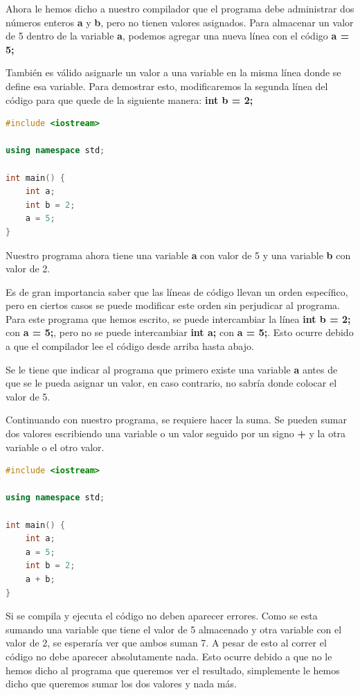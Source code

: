 \documentclass{article}
\begin{document}
Ahora le hemos dicho a nuestro compilador que el programa debe administrar dos números enteros \textbf{a} y \textbf{b}, pero no tienen valores asignados. Para almacenar un valor de 5 dentro de la variable \textbf{a}, podemos agregar una nueva línea con el código \textbf{a = 5;}

También es válido asignarle un valor a una variable en la misma línea donde se define esa variable. Para demostrar esto, modificaremos la segunda línea del código para que quede de la siguiente manera: \textbf{int b = 2;}

\begin{lstlisting}[language=C++, caption=Guardando valores]
#include <iostream>

using namespace std;

int main() {
    int a;
	int b = 2;
	a = 5;
}
\end{lstlisting}

Nuestro programa ahora tiene una variable \textbf{a} con valor de 5 y una variable \textbf{b} con valor de 2.

Es de gran importancia saber que las líneas de código llevan un orden específico, pero en ciertos casos se puede modificar este orden sin perjudicar al programa. Para este programa que hemos escrito, se puede intercambiar la línea \textbf{int b = 2;} con \textbf{a = 5;}, pero no se puede intercambiar \textbf{int a;} con \textbf{a = 5;}. Esto ocurre debido a que el compilador lee el código desde arriba hasta abajo.

Se le tiene que indicar al programa que primero existe una variable \textbf{a} antes de que se le pueda asignar un valor, en caso contrario, no sabría donde colocar el valor de 5.

Continuando con nuestro programa, se requiere hacer la suma. Se pueden sumar dos valores escribiendo una variable o un valor seguido por un signo \textbf{+} y la otra variable o el otro valor.

\begin{lstlisting}[language=C++, caption=Guardando valores]
#include <iostream>

using namespace std;

int main() {
    int a;
    a = 5;
    int b = 2;
    a + b;
}
\end{lstlisting}

Si se compila y ejecuta el código no deben aparecer errores. Como se esta sumando una variable que tiene el valor de 5 almacenado y otra variable con el valor de 2, se esperaría ver que ambos suman 7. A pesar de esto al correr el código no debe aparecer absolutamente nada. Esto ocurre debido a que no le hemos dicho al programa que queremos ver el resultado, simplemente le hemos dicho que queremos sumar los dos valores y nada más.
\end{document}
